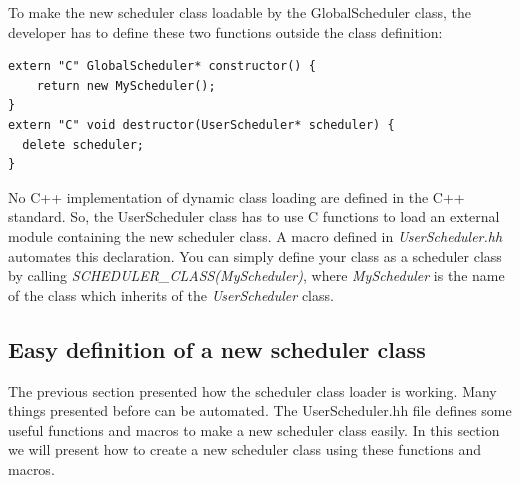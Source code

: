 To make the new scheduler class loadable by the GlobalScheduler class, the
developer has to define these two functions outside the class definition:
\begin{verbatim}
extern "C" GlobalScheduler* constructor() {
    return new MyScheduler();
}
extern "C" void destructor(UserScheduler* scheduler) {
  delete scheduler;
}
\end{verbatim}
No C++ implementation of dynamic class loading are defined in the C++ standard.
So, the UserScheduler class has to use C functions to load an external module
containing the new scheduler class. A macro defined in \textit{UserScheduler.hh}
automates this declaration. You can simply define your class as a scheduler
class by calling \textit{SCHEDULER\_CLASS(MyScheduler)}, where
\textit{MyScheduler} is the name of the class which inherits of
the \textit{UserScheduler} class.

\subsection{Easy definition of a new scheduler class}
The previous section presented how the scheduler class loader is working. Many
things presented before can be automated. The UserScheduler.hh file defines
some useful functions and macros to make a new scheduler class easily. In this
section we will present how to create a new scheduler class using these
functions and macros.

